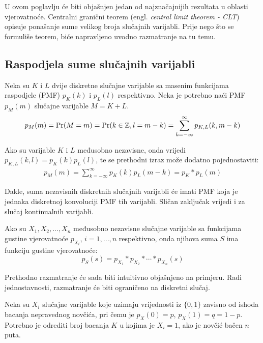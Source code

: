 U ovom poglavlju će biti objašnjen jedan od najznačajnijih rezultata u oblasti
vjerovatnoće. Centralni granični teorem (engl.  \textit{central limit theorem -
CLT}) opisuje ponašanje sume velikog broja slučajnih varijabli. Prije nego što
se formuliše teorem, biće napravljeno uvodno razmatranje na tu temu.

\subsection{Raspodjela sume slučajnih varijabli} \label{sec:clt-suma}

Neka su $K$ i $L$ dvije diskretne slučajne varijable sa masenim funkcijama
raspodjele (PMF) $p_K(k)$ i $p_L(l)$ respektivno. Neka je potrebno naći PMF
$p_M(m)$ slučajne varijable $M=K+L$.
%
\begin{align*}
  p_M(m) = \mathrm{Pr}(M=m) = \mathrm{Pr}(k\in\mathbb{Z}, l=m-k)
  = \sum_{k=-\infty}^{\infty} p_{K,L}(k,m-k)
\end{align*}

Ako su varijable $K$ i $L$ međusobno nezavisne, onda vrijedi $p_{K,L}(k,l) =
p_K(k)p_L(l)$, te se prethodni izraz može dodatno pojednostaviti:
%
\begin{align*}
  p_M(m) = \sum_{k=-\infty}^{\infty} p_K(k)p_L(m-k) = p_K * p_L (m)
\end{align*}

Dakle, suma nezavisnih diskretnih slučajnih varijabli će imati PMF koja je
jednaka diskretnoj konvoluciji PMF tih varijabli. Sličan zaključak vrijedi i za
slučaj kontinualnih varijabli.

\begin{theorem}

  Ako su $X_1,X_2,...,X_n$ međusobno nezavisne slučajne varijable sa funkcijama
  gustine vjerovatnoće $p_{X_i}$, $i=1,...,n$ respektivno, onda njihova suma $S$
  ima funkciju gustine vjerovatnoće:
  $$p_S(s) = p_{X_1} * p_{X_2} * \cdots * p_{X_n} (s)$$

\end{theorem}

Prethodno razmatranje će sada biti intuitivno objašnjeno na primjeru.  Radi
jednostavnosti, razmatranje će biti ograničeno na diskretni slučaj.

\begin{exmp} \label{ex:novcic}
  
Neka su $X_i$ slučajne varijable koje uzimaju vrijednosti iz $\{0,1\}$ zavisno
od ishoda bacanja nepravednog novčića, pri čemu je $p_X(0)= p$, $p_X(1)=q=1-p$.
Potrebno je odrediti broj bacanja $K$ u kojima je $X_i=1$, ako je novčić bačen
$n$ puta.

\end{exmp}

